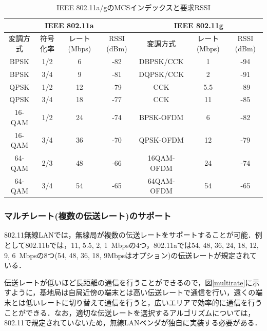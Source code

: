 \documentclass[a4paper,10pt]{ltjsarticle}
\begin{document}
\begin{table}[H]
  \centering
  \caption{IEEE 802.11a/gのMCSインデックスと要求RSSI}
  \label{table:mcs_11abg_rssi}
  \begin{tabular}{c|c|c|c|c|c|c}
      \hline
      \multicolumn{4}{c|}{IEEE 802.11a} & \multicolumn{3}{c}{IEEE 802.11g} \\
      \hline
      変調方式 & 符号化率 & レート (Mbps) & RSSI (dBm) & 変調方式 & レート (Mbps) & RSSI (dBm) \\
      \hline
      BPSK & 1/2 & 6 & -82 & DBPSK/CCK & 1 & -94 \\
      BPSK & 3/4 & 9 & -81 & DQPSK/CCK & 2 & -91 \\
      QPSK & 1/2 & 12 & -79 & CCK & 5.5 & -89 \\
      QPSK & 3/4 & 18 & -77 & CCK & 11 & -85 \\
      16-QAM & 1/2 & 24 & -74 & BPSK-OFDM & 6 & -82 \\
      16-QAM & 3/4 & 36 & -70 & QPSK-OFDM & 12 & -79 \\
      64-QAM & 2/3 & 48 & -66 & 16QAM-OFDM & 24 & -74 \\
      64-QAM & 3/4 & 54 & -65 & 64QAM-OFDM & 54 & -65 \\
      \hline
  \end{tabular}
\end{table}


\clearpage
\subsubsection{マルチレート(複数の伝送レート)のサポート}

802.11無線LANでは，無線局が複数の伝送レートをサポートすることが可能．例として802.11bでは，11, 5.5, 2, 1\, Mbpsの4つ，802.11aでは54, 48, 36, 24, 18, 12, 9, 6\, Mbpsの8つ(54, 48, 36, 18, 9Mbpsはオプション)の伝送レートが規定されている．

伝送レートが低いほど長距離の通信を行うことができるので，図\ref{multirate}に示すように，基地局は自局近傍の端末とは高い伝送レートで通信を行い，遠くの端末とは低いレートに切り替えて通信を行うと，広いエリアで効率的に通信を行うことができる．なお，適切な伝送レートを選択するアルゴリズムについては，802.11で規定されていないため，無線LANベンダが独自に実装する必要がある．
\end{document}
